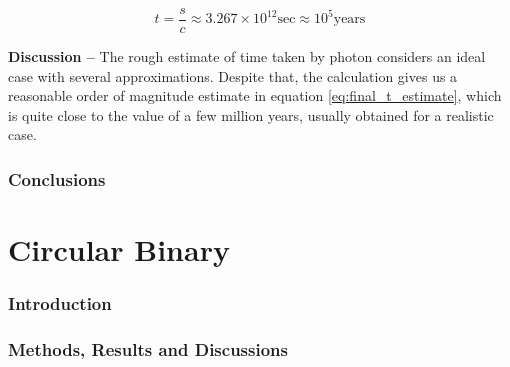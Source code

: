 \documentclass[a4paper]{article}
\begin{document}
\begin{enumerate} [label*=\textbf{(\alph*)}]
					\begin{equation}
					 	t = \frac{s}{c} \approx 3.267 \times 10^{12}_{} \text{sec} \approx 10^5 \text{years}
					 	\label{eq:final_t_estimate}
					\end{equation}
					
				\subitem \textbf{Discussion --}
					The rough estimate of time taken by photon considers an ideal case with several approximations. Despite that, the calculation gives us a reasonable order of magnitude estimate in equation \ref{eq:final_t_estimate}, which is quite close to the value of a few million years, usually obtained for a realistic case.
			
		\end{enumerate}

		
		\section{Conclusions} \label{1:conclusions}
		
		

	
	
	\clearpage
	\setcounter{section}{0}
	\part{Circular Binary} \label{Problem2}
	

		\section{Introduction} \label{2:introduction}

		
		\section{Methods, Results and Discussions}
	
\end{document}
